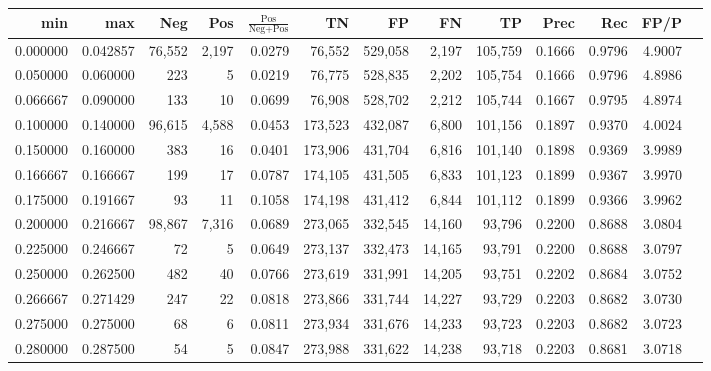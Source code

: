 \begin{tabular}{rrrrrrrrrrrrr}
\toprule
     min &      max &    Neg &    Pos & $\frac{\text{Pos}}{\text{Neg}+\text{Pos}}$ &      TN &      FP &      FN &      TP &   Prec &    Rec &   FP/P \\
\midrule
0.000000 & 0.042857 & 76,552 &  2,197 &                                     0.0279 &  76,552 & 529,058 &   2,197 & 105,759 & 0.1666 & 0.9796 & 4.9007 \\
0.050000 & 0.060000 &    223 &      5 &                                     0.0219 &  76,775 & 528,835 &   2,202 & 105,754 & 0.1666 & 0.9796 & 4.8986 \\
0.066667 & 0.090000 &    133 &     10 &                                     0.0699 &  76,908 & 528,702 &   2,212 & 105,744 & 0.1667 & 0.9795 & 4.8974 \\
0.100000 & 0.140000 & 96,615 &  4,588 &                                     0.0453 & 173,523 & 432,087 &   6,800 & 101,156 & 0.1897 & 0.9370 & 4.0024 \\
0.150000 & 0.160000 &    383 &     16 &                                     0.0401 & 173,906 & 431,704 &   6,816 & 101,140 & 0.1898 & 0.9369 & 3.9989 \\
0.166667 & 0.166667 &    199 &     17 &                                     0.0787 & 174,105 & 431,505 &   6,833 & 101,123 & 0.1899 & 0.9367 & 3.9970 \\
0.175000 & 0.191667 &     93 &     11 &                                     0.1058 & 174,198 & 431,412 &   6,844 & 101,112 & 0.1899 & 0.9366 & 3.9962 \\
0.200000 & 0.216667 & 98,867 &  7,316 &                                     0.0689 & 273,065 & 332,545 &  14,160 &  93,796 & 0.2200 & 0.8688 & 3.0804 \\
0.225000 & 0.246667 &     72 &      5 &                                     0.0649 & 273,137 & 332,473 &  14,165 &  93,791 & 0.2200 & 0.8688 & 3.0797 \\
0.250000 & 0.262500 &    482 &     40 &                                     0.0766 & 273,619 & 331,991 &  14,205 &  93,751 & 0.2202 & 0.8684 & 3.0752 \\
0.266667 & 0.271429 &    247 &     22 &                                     0.0818 & 273,866 & 331,744 &  14,227 &  93,729 & 0.2203 & 0.8682 & 3.0730 \\
0.275000 & 0.275000 &     68 &      6 &                                     0.0811 & 273,934 & 331,676 &  14,233 &  93,723 & 0.2203 & 0.8682 & 3.0723 \\
0.280000 & 0.287500 &     54 &      5 &                                     0.0847 & 273,988 & 331,622 &  14,238 &  93,718 & 0.2203 & 0.8681 & 3.0718 \\

\end{tabular}
